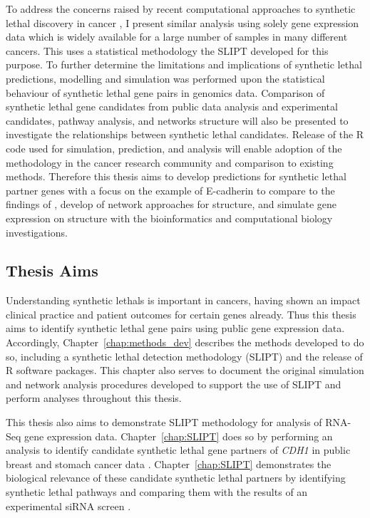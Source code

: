 To address the concerns raised by recent computational approaches to \gls{synthetic lethal} discovery in cancer \citep{Jerby2014, Lu2015, Wappett2016}, I present similar analysis using solely \gls{gene expression} data which is widely available for a large number of samples in many different cancers. This uses a statistical methodology the \gls{SLIPT} developed for this purpose. To further determine the limitations and implications of \gls{synthetic lethal} predictions, modelling and simulation was performed upon the statistical behaviour of \gls{synthetic lethal} gene pairs in \glspl{genomic} data. Comparison of \gls{synthetic lethal} gene candidates from public data analysis and experimental candidates, pathway analysis, and networks structure will also be presented to investigate the relationships between \gls{synthetic lethal} candidates. Release of the R code used for simulation, prediction, and analysis will enable adoption of the methodology in the cancer research community and comparison to existing methods. Therefore this thesis aims to develop predictions for \gls{synthetic lethal} partner genes with a focus on the example of \gls{E-cadherin} to compare to the findings of \citet{Telford2015}, develop of network approaches for  structure, and simulate \gls{gene expression} on  structure with the \gls{bioinformatics} and \gls{computational biology} investigations.

\subsection{Thesis Aims}

Understanding \glspl{synthetic lethal} is important in cancers, having shown an impact clinical practice and patient outcomes for certain genes already. Thus this thesis aims to identify \gls{synthetic lethal} gene pairs using public \gls{gene expression} data. Accordingly, Chapter~\ref{chap:methods_dev} describes the methods developed to do so, including a \gls{synthetic lethal} detection methodology (\gls{SLIPT}) and the release of R software packages. This chapter also serves to document the original simulation and network analysis procedures developed to support the use of \gls{SLIPT} and perform analyses throughout this thesis. 

This thesis also aims to demonstrate \gls{SLIPT} methodology for analysis of \gls{RNA-Seq} \gls{gene expression} data. Chapter~\ref{chap:SLIPT} does so by performing an analysis to identify candidate \gls{synthetic lethal} gene partners of \textit{CDH1} in public breast and stomach cancer data \citep{TCGA2012, TCGA2014GC}. Chapter~\ref{chap:SLIPT} demonstrates the biological relevance of these candidate \gls{synthetic lethal} partners by identifying \gls{synthetic lethal} pathways and comparing them with the results of an experimental \gls{siRNA} screen \citep{Telford2015}.


